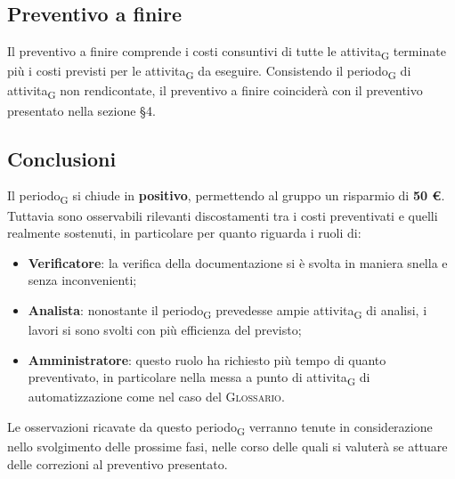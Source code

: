 \subsection{Preventivo a finire}
Il preventivo a finire comprende i costi consuntivi di tutte le \gls{attivita}\textsubscript{G} terminate più i costi previsti per le \gls{attivita}\textsubscript{G} da eseguire. Consistendo il \gls{periodo}\textsubscript{G} di \gls{attivita}\textsubscript{G} non rendicontate, il preventivo a finire coinciderà con il preventivo presentato nella sezione \S 4.



\subsection{Conclusioni}

Il \gls{periodo}\textsubscript{G} si chiude in \textbf{positivo}, permettendo al gruppo un risparmio di \textbf{50 \euro{}}. Tuttavia sono osservabili rilevanti discostamenti tra i costi preventivati e quelli realmente sostenuti, in particolare per quanto riguarda i ruoli di:
\begin{itemize}
	\item \textbf{Verificatore}: la verifica della documentazione si è svolta in maniera snella e senza inconvenienti;
	\item \textbf{Analista}: nonostante il \gls{periodo}\textsubscript{G} prevedesse ampie \gls{attivita}\textsubscript{G} di analisi, i lavori si sono svolti con più efficienza del previsto;
	\item \textbf{Amministratore}: questo ruolo ha richiesto più tempo di quanto preventivato, in particolare nella messa a punto di \gls{attivita}\textsubscript{G} di automatizzazione come nel caso del \textsc{Glossario}.
\end{itemize}
Le osservazioni ricavate da questo \gls{periodo}\textsubscript{G} verranno tenute in considerazione nello svolgimento delle prossime fasi, nelle corso delle quali si valuterà se attuare delle correzioni al preventivo presentato.
